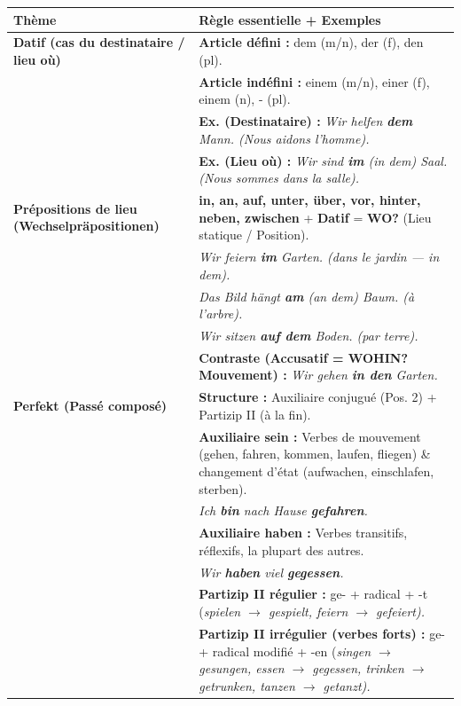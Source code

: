 \documentclass[11pt]{article}
\newcommand{\all}[1]{\ifmmode\text{\textit{#1}}\else\begingroup\selectlanguage{ngerman}\itshape #1\endgroup\fi}
\begin{document}
\begin{propriete}
\begin{center}
\begin{tabularx}{\linewidth}{|X|X|}
\hline
\rowcolor{poppurpleL} \textbf{Thème} & \textbf{Règle essentielle + Exemples} \\
\hline
\textbf{Datif (cas du destinataire / lieu où)} & \textbf{Article défini :} dem (m/n), der (f), den (pl). \\
& \textbf{Article indéfini :} einem (m/n), einer (f), einem (n), - (pl). \\
& \textbf{Ex. (Destinataire) :} \all{Wir helfen \textbf{dem} Mann.} (Nous aidons l'homme). \\
& \textbf{Ex. (Lieu où) :} \all{Wir sind \textbf{im} (in dem) Saal.} (Nous sommes dans la salle). \\
\hline
\textbf{Prépositions de lieu (Wechselpräpositionen)} & \textbf{in, an, auf, unter, über, vor, hinter, neben, zwischen} + \textbf{Datif} = \textbf{WO?} (Lieu statique / Position). \\
& \all{Wir feiern \textbf{im} Garten.} (dans le jardin — \emph{in dem}). \\
& \all{Das Bild hängt \textbf{am} (an dem) Baum.} (à l'arbre). \\
& \all{Wir sitzen \textbf{auf dem} Boden.} (par terre). \\
& \textbf{Contraste (Accusatif = WOHIN? Mouvement) :} \all{Wir gehen \textbf{in den} Garten.} \\
\hline
\textbf{Perfekt (Passé composé)} & \textbf{Structure :} Auxiliaire conjugué (Pos. 2) + Partizip II (à la fin). \\
& \textbf{Auxiliaire \textbf{sein} :} Verbes de mouvement (gehen, fahren, kommen, laufen, fliegen) \& changement d'état (aufwachen, einschlafen, sterben). \\
& \all{Ich \textbf{bin} nach Hause \textbf{gefahren}.} \\
& \textbf{Auxiliaire \textbf{haben} :} Verbes transitifs, réflexifs, la plupart des autres. \\
& \all{Wir \textbf{haben} viel \textbf{gegessen}.} \\
& \textbf{Partizip II régulier :} ge- + radical + -t (\all{spielen $\to$ gespielt}, \all{feiern $\to$ gefeiert}). \\
& \textbf{Partizip II irrégulier (verbes forts) :} ge- + radical modifié + -en (\all{singen $\to$ gesungen}, \all{essen $\to$ gegessen}, \all{trinken $\to$ getrunken}, \all{tanzen $\to$ getanzt}). \\

\end{tabularx}
\end{center}
\end{propriete}
\end{document}
